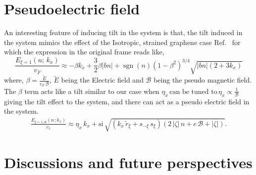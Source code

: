 \documentclass[aps,prb, onecolumn,nofootinbib,citeautoscript,10pt]{revtex4-2}
\begin{document}
\section{Pseudoelectric field}

An interesting feature of inducing tilt in the system is that, the tilt induced in the system mimics the effect of the Isotropic, strained graphene case Ref.~\cite{strained-dirac-franz} for which the expression in the original frame reads like,
\begin{equation}
\frac{E_{\xi=1}(n;\,k_x)}{v_F}
\approx
-\beta k_x
+\frac{3}{2}\beta |bn|
+\operatorname{sgn}(n)(1-\beta^2)^{3/4}
\sqrt{|bn|(2+3k_x)}
\end{equation}
where, $\beta=\frac{\tilde{E}}{v_F \, \mathcal{B}}$, $\tilde{E}$ being the Electric field and $\mathcal{B}$ being the pseudo magnetic field. The $\beta$ term acts like a tilt similar to our case when $\eta_x \, \text{can be tuned to} \, \eta_x \propto \frac{1}{\mathcal{B}}$ giving the tilt effect to the system, and there can act as a pseudo electric field in the system.
\begin{align}
\frac{E_{\xi=1, \text{si}}(n\, ; k_x) } {v_x} \approx   \eta_x \,   k_x 
+ \text{si}\, \sqrt{\left (k_x \, \tilde r_\xi + s_{-\xi} \, s_\xi \right )
\left (2 \, |\zeta |\, n + e \, \mathcal B+|\zeta| \right )} .
\end{align}


\section{Discussions and future perspectives}
\label{secsum}
\end{document}
